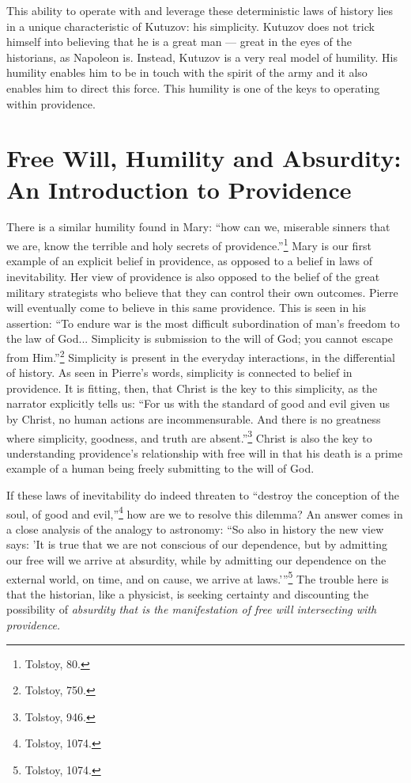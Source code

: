 \documentclass[12pt]{article}
\begin{document}
This ability to operate with and leverage these deterministic laws of history lies in a unique characteristic of Kutuzov: his simplicity. Kutuzov does not trick himself into believing that he is a great man --- great in the eyes of the historians, as Napoleon is. Instead, Kutuzov is a very real model of humility. His humility enables him to be in touch with the spirit of the army and it also enables him to direct this force. This humility is one of the keys to operating within providence.

\section{Free Will, Humility and Absurdity: An Introduction to Providence}
There is a similar humility found in Mary: ``how can we, miserable sinners that we are, know the terrible and holy secrets of providence.''\footnote{Tolstoy, 80.} Mary is our first example of an explicit belief in providence, as opposed to a belief in laws of inevitability. Her view of providence is also opposed to the belief of the great military strategists who believe that they can control their own outcomes. Pierre will eventually come to believe in this same providence. This is seen in his assertion: ``To endure war is the most difficult subordination of man's freedom to the law of God... Simplicity is submission to the will of God; you cannot escape from Him.''\footnote{Tolstoy, 750.} Simplicity is present in the everyday interactions, in the differential of history. As seen in Pierre's words, simplicity is connected to belief in providence. It is fitting, then, that Christ is the key to this simplicity, as the narrator explicitly tells us: ``For us with the standard of good and evil given us by Christ, no human actions are incommensurable. And there is no greatness where simplicity, goodness, and truth are absent.''\footnote{Tolstoy, 946.} Christ is also the key to understanding providence's relationship with free will in that his death is a prime example of a human being freely submitting to the will of God.

If these laws of inevitability do indeed threaten to ``destroy the conception of the soul, of good and evil,''\footnote{Tolstoy, 1074.} how are we to resolve this dilemma? An answer comes in a close analysis of the analogy to astronomy: ``So also in history the new view says: 'It is true that we are not conscious of our dependence, but by admitting our free will we arrive at absurdity, while by admitting our dependence on the external world, on time, and on cause, we arrive at laws.'\thinspace''\footnote{Tolstoy, 1074.} The trouble here is that the historian, like a physicist, is seeking certainty and discounting the possibility of \emph{absurdity that is the manifestation of free will intersecting with providence.} 
\end{document}
